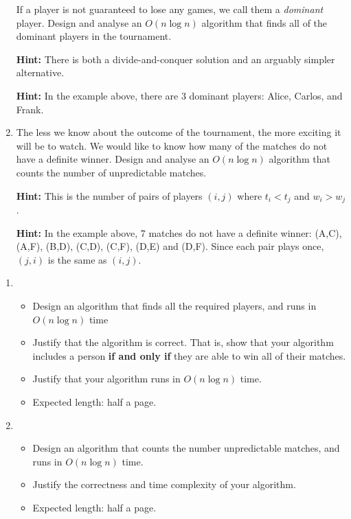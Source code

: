 \documentclass[12pt]{article}
\begin{document}
\begin{question}
\begin{enumerate}[label = (\alph*)]
    If a player is not guaranteed to lose any games, we call them a \emph{dominant} player. Design and analyse an $O(n\log n)$ algorithm that finds all of the dominant players in the tournament.

    \textbf{Hint:} There is both a divide-and-conquer solution and an arguably simpler alternative.

    \textbf{Hint:} In the example above, there are 3 dominant players: Alice, Carlos, and Frank.

    \item \label{part b} The less we know about the outcome of the tournament, the more exciting it will be to watch. We would like to know how many of the matches do not have a definite winner. Design and analyse an $O(n\log n)$ algorithm that counts the number of unpredictable matches.

    \textbf{Hint:} This is the number of pairs of players $(i,j)$ where $t_i < t_j$ and $w_i > w_j$.
    
    \textbf{Hint:} In the example above, 7 matches do not have a definite winner: {(A,C), (A,F), (B,D), (C,D), (C,F), (D,E) and (D,F)}. Since each pair plays once, \((j,i)\) is the same as \((i, j)\).

\end{enumerate}
\end{question}

\begin{rubric}
    \begin{enumerate}
        \item \begin{itemize}
            \item Design an algorithm that finds all the required players, and runs in $O(n \log n)$ time
            \item Justify that the algorithm is correct. That is, show that your algorithm includes a person \textbf{if and only if} they are able to win all of their matches.
            \item Justify that your algorithm runs in $O(n \log n)$ time.
            \item Expected length: half a page.
        \end{itemize}
        \item \begin{itemize}
            \item Design an algorithm that counts the number unpredictable matches, and runs in $O(n \log n)$ time.
            \item Justify the correctness and time complexity of your algorithm.
            \item Expected length: half a page.
        \end{itemize}
    \end{enumerate}
\end{rubric}

\begin{solution}
\end{solution}

\begin{attribution}
\end{attribution}
\end{document}
